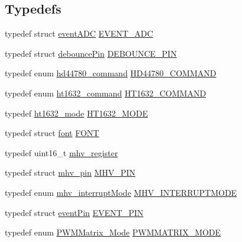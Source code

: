 \subsection*{Typedefs}
\begin{DoxyCompactItemize}
\item 
typedef struct \hyperlink{structmhvlib_1_1event_a_d_c}{event\-A\-D\-C} \hyperlink{namespacemhvlib_ac219542e8f4858d30b5f6a025d7dd0dc}{E\-V\-E\-N\-T\-\_\-\-A\-D\-C}
\item 
typedef struct \hyperlink{structmhvlib_1_1debounce_pin}{debounce\-Pin} \hyperlink{namespacemhvlib_a290c64687661f8a9ffaa662db0052f63}{D\-E\-B\-O\-U\-N\-C\-E\-\_\-\-P\-I\-N}
\item 
typedef enum \hyperlink{namespacemhvlib_a663d75c53523cc1b99bb317bb511c10b}{hd44780\-\_\-command} \hyperlink{namespacemhvlib_a810a3cc703298cdd5d00c913cb1bfec9}{H\-D44780\-\_\-\-C\-O\-M\-M\-A\-N\-D}
\item 
typedef enum \hyperlink{namespacemhvlib_aac0011a986872f3227927308b8e5f3ad}{ht1632\-\_\-command} \hyperlink{namespacemhvlib_aca900e05b6564a3da702081e7b394379}{H\-T1632\-\_\-\-C\-O\-M\-M\-A\-N\-D}
\item 
typedef \hyperlink{namespacemhvlib_a80546075fa8ed27eef7a02831a5c5010}{ht1632\-\_\-mode} \hyperlink{namespacemhvlib_ab8e91a9eed76f8015375b6681b4a641a}{H\-T1632\-\_\-\-M\-O\-D\-E}
\item 
typedef struct \hyperlink{structmhvlib_1_1font}{font} \hyperlink{namespacemhvlib_ac8cf789cdad5097b81a2d75dc08e6bfc}{F\-O\-N\-T}
\item 
typedef uint16\-\_\-t \hyperlink{namespacemhvlib_a0c171f0b162817f27df6c10c611a0f37}{mhv\-\_\-register}
\item 
typedef struct \hyperlink{structmhvlib_1_1mhv__pin}{mhv\-\_\-pin} \hyperlink{namespacemhvlib_a3fc44352ee2826fe480452ba1acd5de7}{M\-H\-V\-\_\-\-P\-I\-N}
\item 
typedef enum \hyperlink{namespacemhvlib_a362dabb801976750e4eea2ad26261989}{mhv\-\_\-interrupt\-Mode} \hyperlink{namespacemhvlib_a6d4bdd6a3350e14306ea380cf5bba370}{M\-H\-V\-\_\-\-I\-N\-T\-E\-R\-R\-U\-P\-T\-M\-O\-D\-E}
\item 
typedef struct \hyperlink{structmhvlib_1_1event_pin}{event\-Pin} \hyperlink{namespacemhvlib_acf4cd7c00d020d1fef8ecfe350328f3b}{E\-V\-E\-N\-T\-\_\-\-P\-I\-N}
\item 
typedef enum \hyperlink{namespacemhvlib_a3aee9fc37de555be9719103e177f7b25}{P\-W\-M\-Matrix\-\_\-\-Mode} \hyperlink{namespacemhvlib_a65e3004ad916bc283b80fb7e2a7f29b7}{P\-W\-M\-M\-A\-T\-R\-I\-X\-\_\-\-M\-O\-D\-E}

\end{DoxyCompactItemize}
